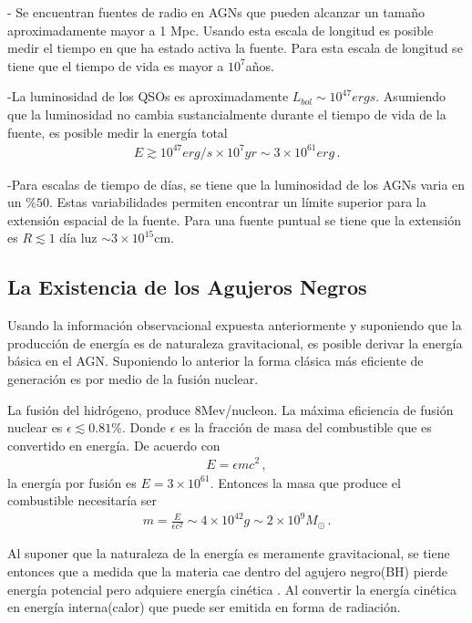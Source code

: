 - Se encuentran fuentes de radio en AGNs que pueden alcanzar un tamaño aproximadamente mayor a 1 Mpc. Usando esta escala de longitud es posible medir el tiempo en que ha estado activa la fuente. Para esta escala de longitud se tiene que el tiempo de vida es mayor a $10^{7}$años.

-La luminosidad de los QSOs es aproximadamente $L_{bol}\sim 10^{47}ergs$. Asumiendo que la luminosidad no cambia sustancialmente durante el tiempo de vida de la fuente, es posible medir la energía total
\begin{align}
E \gtrsim 10^{47} erg/s \times 10^{7}yr \sim 3\times 10^{61}erg\,.
\end{align}

-Para escalas de tiempo de días, se tiene que la luminosidad de los AGNs varia en un $\% 50$. Estas variabilidades permiten encontrar un límite superior para la extensión espacial de la fuente. Para una fuente puntual se tiene que la extensión es $R \lesssim 1$ día luz $\sim3\times10^{15}$cm.


	\subsection{La Existencia de los Agujeros Negros}
	\label{subsec:Why_a_BH}

Usando la información observacional expuesta anteriormente y suponiendo que la producción de energía es de naturaleza gravitacional, es posible derivar la energía básica en el AGN. Suponiendo lo anterior la forma clásica más eficiente de generación es por medio de la fusión nuclear. 

La fusión del hidrógeno, produce 8Mev/nucleon. La máxima eficiencia de fusión nuclear es $\epsilon \lesssim 0.81 \%$. Donde $\epsilon$ es la fracción de masa del combustible que es convertido en energía. De acuerdo con 
\begin{align}
E=\epsilon mc^{2}\,,
\end{align}
%
la energía por fusión es $E=3\times10^{61}$. Entonces la masa que produce el combustible necesitaría ser 
\begin{align}
m=\frac{E}{\epsilon c^{2}} \sim 4\times10^{42}g\sim 2\times10^{9}M_{\odot}\,.
\end{align}

Al suponer que la naturaleza de la energía es meramente gravitacional, se tiene entonces que a medida que la materia cae dentro del agujero negro(BH) pierde energía potencial pero adquiere energía cinética . Al convertir la energía cinética en energía interna(calor) que puede ser emitida en forma de radiación.

